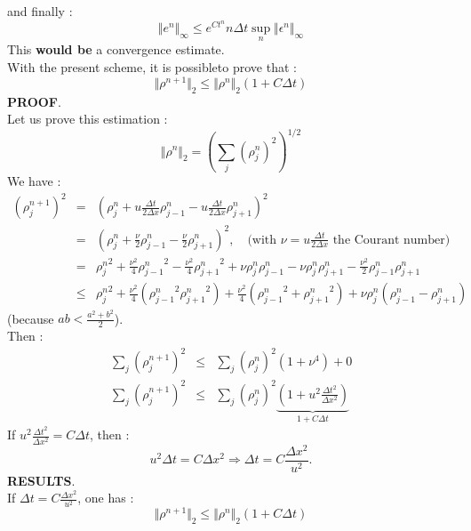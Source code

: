 \documentclass{report}
\theoremstyle{plain}
\theoremstyle{definition}
\theoremstyle{remark}
\begin{document}
and finally :
\begin{equation}
\Vert e^n \Vert_\infty \le e^{Ct^n}n \Delta t \sup_{n} \Vert \epsilon^n  \Vert_\infty
\end{equation}
This \textbf{would be} a convergence estimate.\\
With the present scheme, it is possibleto prove that :
\begin{equation}
\Vert \rho^{n+1} \Vert_2 \le \Vert \rho^n \Vert_2 (1 + C\Delta t)
\end{equation}
\textbf{PROOF}. \\
Let us prove this estimation : 
\begin{equation}
\Vert \rho^n \Vert_2 = \left(\sum_j (\rho_j^n)^2 \right)^{1/2}
\end{equation}
We have :
\begin{eqnarray}
\left(\rho_j^{n+1}\right)^2 &=& \left(\rho^n_j + u\frac{\Delta t }{2 \Delta x}\rho_{j-1}^n - u\frac{\Delta t }{2 \Delta x}\rho_{j+1}^n \right)^2 \\
&=& \left(\rho^n_j + \frac{\nu}{2}\rho_{j-1}^n - \frac{\nu}{2}\rho_{j+1}^n \right)^2, \quad \text{(with } \nu = u\frac{\Delta t }{2 \Delta x} \text{ the Courant number)} \\
&=& {\rho^n_j}^2 + \frac{\nu^2}{4}{\rho_{j-1}^n}^2 - \frac{\nu^2}{4}{\rho_{j+1}^n}^2 + \nu \rho^n_j \rho_{j-1}^n - \nu \rho_{j}^n \rho_{j+1}^n - \frac{\nu^2}{2}\rho_{j-1}^n \rho_{j+1}^n \\
& \le & {\rho_j^n}^2 + \frac{\nu^2}{4}({\rho_{j-1}^n}^2 {\rho_{j+1}^n}^2) + \frac{\nu^2}{4} ({\rho_{j-1}^n}^2 + {\rho_{j+1}^n}^2) + \nu \rho_{j}^n(\rho_{j-1}^n - \rho_{j+1}^n)
\end{eqnarray}
(because $ab < \frac{a^2+b^2}{2}$). \\
Then :
\begin{eqnarray}
\sum_j \left(\rho_j^{n+1}\right)^2 & \le & \sum_j \left(\rho_j^{n}\right)^2 (1 + \nu^4) + 0 \\
\sum_j \left(\rho_j^{n+1}\right)^2 & \le & \sum_j \left(\rho_j^{n}\right)^2 \underbrace{(1 + u^2 \frac{\Delta t^2}{\Delta x^2})}_{1+C\Delta t}
\end{eqnarray}
If $u^2 \frac{\Delta t^2}{\Delta x^2} = C\Delta t$, then : 
$$ u^2 \Delta t = C \Delta x^2 \Rightarrow \Delta t = C \frac{\Delta x^2}{u^2}.$$
\textbf{RESULTS}. \\
If $\Delta t = C \frac{\Delta x^2}{u^2}$, one has :
\begin{equation}
\Vert \rho^{n+1} \Vert_2 \le \Vert \rho^n \Vert_2 (1+C\Delta t)
\end{equation}
\end{document}
